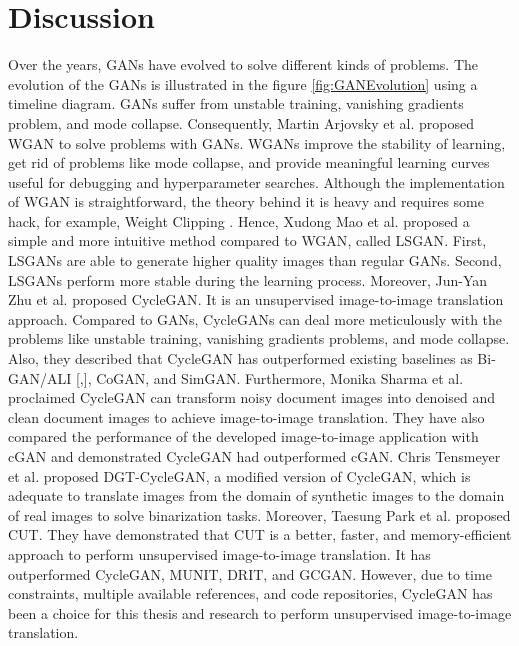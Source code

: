 

\section{Discussion}\label{rwdiscussion}
Over the years, \acp{GAN} have evolved to solve different kinds of problems. The evolution of the \acp{GAN} is illustrated in the figure \ref{fig:GANEvolution} using a timeline diagram. \acp{GAN} suffer from unstable training, vanishing gradients problem, and mode collapse. Consequently, Martin Arjovsky et al.\cite{arjovsky2017wasserstein} proposed \ac{WGAN} to solve problems with \acp{GAN}. \acp{WGAN} improve the stability of learning, get rid of problems like mode collapse, and provide meaningful learning curves useful for debugging and hyperparameter searches. Although the implementation of \ac{WGAN} is straightforward, the theory behind it is heavy and requires some hack, for example, Weight Clipping \cite{gulrajani2017improved}. Hence, Xudong Mao et al.\cite{mao2017squares} proposed a simple and more intuitive method compared to \ac{WGAN}, called \ac{LSGAN}. First, \acp{LSGAN} are able to generate higher quality images than regular \acp{GAN}. Second, \acp{LSGAN} perform more stable during the learning process. Moreover, Jun-Yan Zhu et al.\cite{zhu2020unpaired} proposed \ac{CycleGAN}. It is an unsupervised image-to-image translation approach. Compared to \acp{GAN}, \acp{CycleGAN} can deal more meticulously with the problems like unstable training, vanishing gradients problems, and mode collapse. Also, they described that \ac{CycleGAN} has outperformed existing baselines as Bi-GAN/ALI [\cite{donahue2017adversarial},\cite{dumoulin2017adversarially}], CoGAN\cite{liu2016coupled}, and SimGAN\cite{shrivastava2017learning}. Furthermore, Monika Sharma et al.\cite{sharma2019learning} proclaimed  \ac{CycleGAN} can transform noisy document images into denoised and clean document images to achieve image-to-image translation. They have also compared the performance of the developed image-to-image application with \ac{cGAN} and demonstrated \ac{CycleGAN} had outperformed \ac{cGAN}. Chris Tensmeyer et al.\cite{8978087} proposed DGT-CycleGAN, a modified version of \ac{CycleGAN}, which is adequate to translate images from the domain of synthetic images to the domain of real images to solve binarization tasks. Moreover, Taesung Park et al.\cite{park2020contrastive} proposed \ac{CUT}. They have demonstrated that \ac{CUT} is a better, faster, and memory-efficient approach to perform unsupervised image-to-image translation. It has outperformed \ac{CycleGAN}\cite{zhu2020unpaired}, \ac{MUNIT}\cite{liu2018unsupervised}, \ac{DRIT}\cite{lee2019drit}, and \ac{GCGAN}\cite{fu2018geometryconsistent}. However, due to time constraints, multiple available references, and code repositories, \ac{CycleGAN} has been a choice for this thesis and research to perform unsupervised image-to-image translation.


